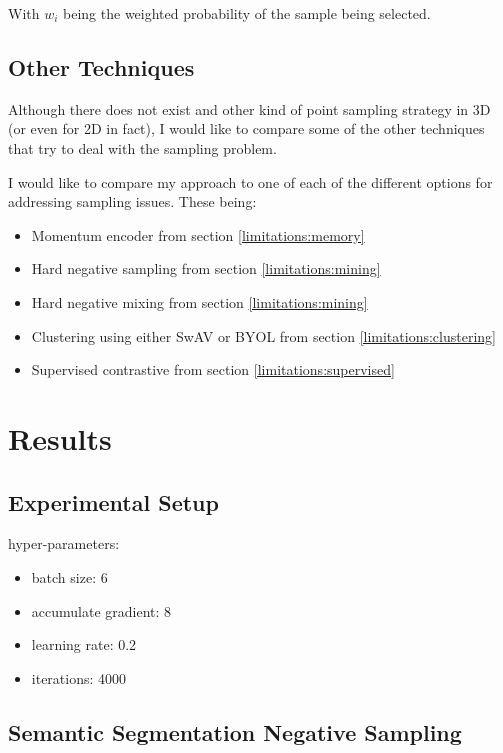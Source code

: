 \documentclass[12pt]{article}
\begin{document}
With $w_i$ being the weighted probability of the sample being selected.


\subsection{Other Techniques}

Although there does not exist and other kind of point sampling strategy in 3D (or even for 2D in fact), I would like to compare some of the other techniques that try to deal with the sampling problem.
%

I would like to compare my approach to one of each of the different options for addressing sampling issues. These being:

\begin{itemize}
    \item Momentum encoder from section \ref{limitations:memory}
    \item Hard negative sampling from section \ref{limitations:mining}
    \item Hard negative mixing from section \ref{limitations:mining}
    \item Clustering using either SwAV or BYOL from section \ref{limitations:clustering}
    \item Supervised contrastive from section \ref{limitations:supervised}
\end{itemize}

\pagebreak

\section{Results}

\subsection{Experimental Setup}

hyper-parameters:

\begin{itemize}
    \item batch size: 6
    \item accumulate gradient: 8
    \item learning rate: 0.2
    \item iterations: 4000
\end{itemize}



\subsection{Semantic Segmentation Negative Sampling}
\end{document}
